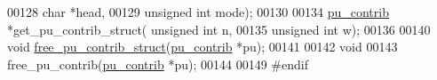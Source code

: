 \begin{DoxyCode}
00128             \textcolor{keywordtype}{char} *head,
00129             \textcolor{keywordtype}{unsigned} \textcolor{keywordtype}{int} mode);
00130 
00134 \hyperlink{group__data__structures_structpu__contrib}{pu\_contrib}  *get\_pu\_contrib\_struct( \textcolor{keywordtype}{unsigned} \textcolor{keywordtype}{int} n,
00135                                     \textcolor{keywordtype}{unsigned} \textcolor{keywordtype}{int} w);
00136 
00140 \textcolor{keywordtype}{void}        \hyperlink{group__up__cofold_gac20bd61824981d45ce0dc9934aa56df8}{free\_pu\_contrib\_struct}(\hyperlink{group__data__structures_structpu__contrib}{pu\_contrib} *pu);
00141 
00142 \textcolor{keywordtype}{void}
00143 free\_pu\_contrib(\hyperlink{group__data__structures_structpu__contrib}{pu\_contrib} *pu);
00144 
00149 \textcolor{preprocessor}{#endif}
\end{DoxyCode}
